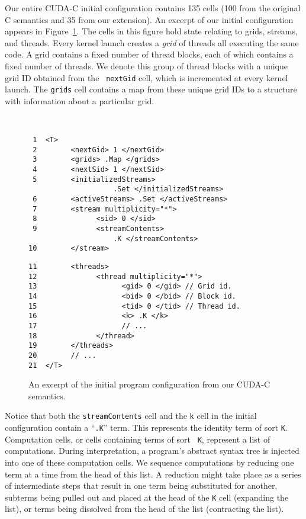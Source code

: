 Our entire CUDA-C initial configuration contains 135 cells (100 from the
original C semantics and 35 from our extension). An excerpt of our initial
configuration appears in Figure~\ref{fig:config}. The cells in this figure hold
state relating to grids, streams, and threads. Every kernel launch creates a
{\em grid} of threads all executing the same code. A grid contains a fixed
number of thread blocks, each of which contains a fixed number of threads. We
denote this group of thread blocks with a unique grid ID obtained from the {\tt
nextGid} cell, which is incremented at every kernel launch. The {\tt grids} cell
contains a map from these unique grid IDs to a structure with information about
a particular grid.

\begin{figure}
~~~~~
\begin{minipage}[t]{2.8in}
{\scriptsize
\begin{verbatim}
 1	<T>
 2	      <nextGid> 1 </nextGid> 
 3	      <grids> .Map </grids>
 4	      <nextSid> 1 </nextSid>
 5	      <initializedStreams> 
                    .Set </initializedStreams>
 6	      <activeStreams> .Set </activeStreams>
 7	      <stream multiplicity="*"> 
 8	            <sid> 0 </sid>
 9	            <streamContents> 
                    .K </streamContents>
10	      </stream>
\end{verbatim}
}
\end{minipage}
\begin{minipage}[t]{2.8in}
{\scriptsize
\begin{verbatim}
11	      <threads>
12	            <thread multiplicity="*">
13	                  <gid> 0 </gid> // Grid id.
14	                  <bid> 0 </bid> // Block id.
15	                  <tid> 0 </tid> // Thread id.
16	                  <k> .K </k>
17	                  // ...
18	            </thread>
19	      </threads>
20	      // ...
21	</T>
\end{verbatim}
}
\end{minipage}
\caption{An excerpt of the \K initial program configuration from our CUDA-C
semantics.}
\label{fig:config}
\end{figure}

Notice that both the {\tt streamContents} cell and the {\tt k} cell in the
initial configuration contain a ``{\tt .K}'' term. This represents the identity
term of sort {\tt K}. Computation cells, or cells containing terms of sort {\tt
K}, represent a list of computations. During interpretation, a program's
abstract syntax tree is injected into one of these computation cells. We
sequence computations by reducing one term at a time from the head of this list.
A reduction might take place as a series of intermediate steps that result in
one term being substituted for another, subterms being pulled out and placed at
the head of the {\tt K} cell (expanding the list), or terms being dissolved from
the head of the list (contracting the list).

